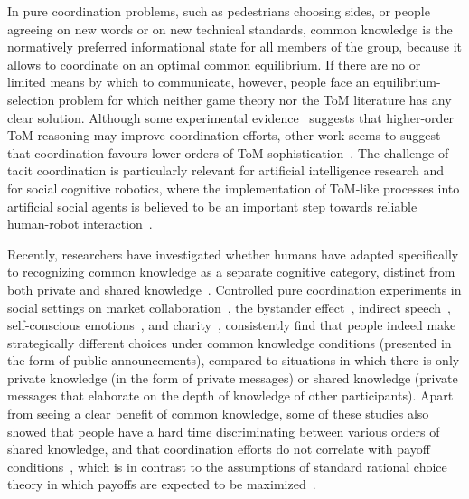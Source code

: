 In pure coordination problems, such as pedestrians choosing sides, or people agreeing on new words or on new technical standards, common knowledge is the normatively preferred informational state for all members of the group, because it allows to coordinate on an optimal common equilibrium. If there are no or limited means by which to communicate, however, people face an equilibrium-selection problem for which neither game theory nor the ToM literature has any clear solution. Although some experimental evidence~\cite{curry2012putting} suggests that higher-order ToM reasoning may improve coordination efforts, other work seems to suggest that coordination favours lower orders of ToM sophistication~\cite{ devaine2014theory, de2015higher}. The challenge of tacit coordination is particularly relevant for artificial intelligence research and for social cognitive robotics, where the implementation of ToM-like processes into artificial social agents is believed to be an important step towards reliable human-robot interaction~\cite{erb2016artificial, bolander2018seeing, bard2020hanabi, dissing2020implementing}.

Recently, researchers have investigated whether humans have adapted specifically to recognizing common knowledge as a separate cognitive category, distinct from both private and shared knowledge~\cite{de2019common}. Controlled pure coordination experiments in social settings on market collaboration~\cite{thomas2014psychology}, the bystander effect~\cite{thomas2016recursive}, indirect speech~\cite{lee2010rationales}, self-conscious emotions~\cite{thomas2018common}, and charity~\cite{de2019maimonides}, consistently find that people indeed make strategically different choices under common knowledge conditions (presented in the form of public announcements), compared to situations in which there is only private knowledge (in the form of private messages) or shared knowledge (private messages that elaborate on the depth of knowledge of other participants). Apart from seeing a clear benefit of common knowledge, some of these studies also showed that people have a hard time discriminating between various orders of shared knowledge, and that coordination efforts do not correlate with payoff conditions~\cite{thomas2014psychology}, which is in contrast to the assumptions of standard rational choice theory in which payoffs are expected to be maximized~\cite{becker1976economic}.

